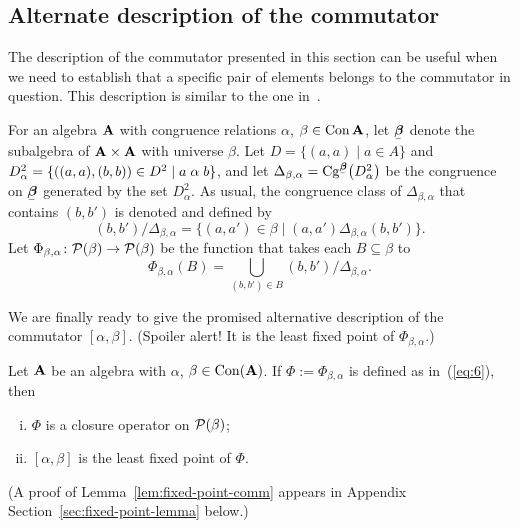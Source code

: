 \subsection{Alternate description of the commutator}
\label{sec:altern-descr-comm}
The description of the commutator presented in this section can be 
useful when we need to establish that a specific pair of elements
belongs to the commutator in question. This  description is
similar to the one in~\cite[p.~930]{MR1358491}.

For an algebra $\mathbf{A}$ with congruence relations $\alpha$, $\beta\in \operatorname{Con}\mathbf{A}$,
let $\bbeta$ denote the subalgebra of $\mathbf{A}\times \mathbf{A}$ with universe 
$\beta$.
Let $D = \{(a,a) \mid a\in A\}$ and 
$D^2_\alpha = \{((a,a), (b,b)) \in D^2 \mid a\mathrel{\alpha} b\}$,
and let
$\Delta_{\beta, \alpha} = \Cg^{\bbeta}\bigl(D^2_\alpha \bigr)$ be
the congruence on $\bbeta$ generated by the set $D^2_\alpha$.
As usual, the congruence class of $\Delta_{\beta, \alpha}$ that contains
$(b,b')$ is denoted and defined by 
\[
(b,b')/\Delta_{\beta,\alpha} = \{(a,a') \in \beta \mid (a,a') \mathrel{\Delta_{\beta,\alpha}} (b,b')\}.
\]
Let $\Phi_{\beta, \alpha} \colon \mathcal{P}(\beta) \to \mathcal{P}(\beta)$ be the function that
takes each $B \subseteq \beta$ to
\begin{equation}
  \label{eq:6}
  \Phi_{\beta, \alpha}(B) = \bigcup_{(b,b')\in B} (b,b')/\Delta_{\beta, \alpha}.
\end{equation}
\newcommand{\Phiba}{\ensuremath{\Phi}}

We are finally ready to give the promised alternative description of the
commutator $[\alpha, \beta]$. (Spoiler alert! It is the least fixed point of
$\Phi_{\beta, \alpha}$.)
\begin{lemma}
  \label{lem:fixed-point-comm}
  Let $\mathbf{A}$ be an algebra with $\alpha$, $\beta\in \operatorname{Con}(\mathbf{A})$.
  If $\Phi:=\Phi_{\beta, \alpha}$ is defined as in~(\ref{eq:6}), then 
  \begin{enumerate}[(i)]
  \item \label{item:111} $\Phiba$ is a closure operator on $\mathcal{P}(\beta)$;
  \item \label{item:222} $[\alpha, \beta]$ is the least fixed point of $\Phiba$.
  \end{enumerate}
\end{lemma}
\noindent (A proof of Lemma~\ref{lem:fixed-point-comm} appears in Appendix
Section~\ref{sec:fixed-point-lemma} below.)


